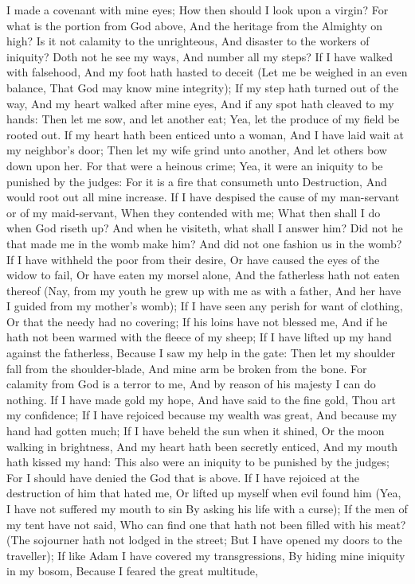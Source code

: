 I made a covenant with mine eyes; How then should I look upon a virgin?  For what is the portion from God above, And the heritage from the Almighty on high?  Is it not calamity to the unrighteous, And disaster to the workers of iniquity?  Doth not he see my ways, And number all my steps?  If I have walked with falsehood, And my foot hath hasted to deceit  (Let me be weighed in an even balance, That God may know mine integrity);  If my step hath turned out of the way, And my heart walked after mine eyes, And if any spot hath cleaved to my hands:  Then let me sow, and let another eat; Yea, let the produce of my field be rooted out.  If my heart hath been enticed unto a woman, And I have laid wait at my neighbor’s door;  Then let my wife grind unto another, And let others bow down upon her.  For that were a heinous crime; Yea, it were an iniquity to be punished by the judges:  For it is a fire that consumeth unto Destruction, And would root out all mine increase.  If I have despised the cause of my man-servant or of my maid-servant, When they contended with me;  What then shall I do when God riseth up? And when he visiteth, what shall I answer him?  Did not he that made me in the womb make him? And did not one fashion us in the womb?  If I have withheld the poor from their desire, Or have caused the eyes of the widow to fail,  Or have eaten my morsel alone, And the fatherless hath not eaten thereof  (Nay, from my youth he grew up with me as with a father, And her have I guided from my mother’s womb);  If I have seen any perish for want of clothing, Or that the needy had no covering;  If his loins have not blessed me, And if he hath not been warmed with the fleece of my sheep;  If I have lifted up my hand against the fatherless, Because I saw my help in the gate:  Then let my shoulder fall from the shoulder-blade, And mine arm be broken from the bone.  For calamity from God is a terror to me, And by reason of his majesty I can do nothing.  If I have made gold my hope, And have said to the fine gold, Thou art my confidence;  If I have rejoiced because my wealth was great, And because my hand had gotten much;  If I have beheld the sun when it shined, Or the moon walking in brightness,  And my heart hath been secretly enticed, And my mouth hath kissed my hand:  This also were an iniquity to be punished by the judges; For I should have denied the God that is above.  If I have rejoiced at the destruction of him that hated me, Or lifted up myself when evil found him  (Yea, I have not suffered my mouth to sin By asking his life with a curse);  If the men of my tent have not said, Who can find one that hath not been filled with his meat?  (The sojourner hath not lodged in the street; But I have opened my doors to the traveller);  If like Adam I have covered my transgressions, By hiding mine iniquity in my bosom,  Because I feared the great multitude, 